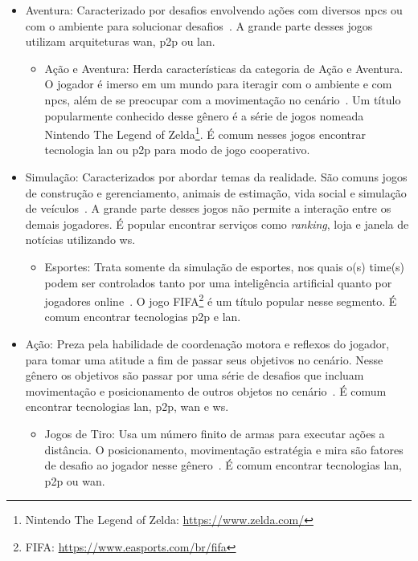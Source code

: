 \begin{itemize}
\begin{itemize}
    \end{itemize}
  \item Aventura: Caracterizado por desafios envolvendo ações com diversos \ac{npcs} ou com o ambiente para solucionar desafios~\cite{adams_1208533}. A grande parte desses jogos utilizam arquiteturas \ac{wan}, \ac{p2p} ou \ac{lan}.
    \begin{itemize}
      \item Ação e Aventura: Herda características da categoria de Ação e Aventura. O jogador é imerso em um mundo para iteragir com o ambiente e com \ac{npcs}, além de se preocupar com a movimentação no cenário~\cite{adams_1208533}. Um título popularmente conhecido desse gênero é a série de jogos nomeada Nintendo The Legend of Zelda\footnote{Nintendo The Legend of Zelda: \url{https://www.zelda.com/}}. É comum nesses jogos encontrar tecnologia \ac{lan} ou \ac{p2p} para modo de jogo cooperativo.
    \end{itemize}
  \item Simulação: Caracterizados por abordar temas da realidade. São comuns jogos de construção e gerenciamento, animais de estimação, vida social e simulação de veículos~\cite{adams_1208533}. A grande parte desses jogos não permite a interação entre os demais jogadores. É popular encontrar serviços como \textit{ranking}, loja e janela de notícias utilizando \ac{ws}.
    \begin{itemize}
      \item Esportes: Trata somente da simulação de esportes, nos quais o(s) time(s) podem ser controlados tanto por uma inteligência artificial quanto por jogadores online~\cite{adams_1208533}. O jogo FIFA\footnote{FIFA: \url{https://www.easports.com/br/fifa}} é um título popular nesse segmento. É comum encontrar tecnologias \ac{p2p} e \ac{lan}.
    \end{itemize}
  \item Ação: Preza pela habilidade de coordenação motora e reflexos do jogador, para tomar uma atitude a fim de passar seus objetivos no cenário. Nesse gênero os objetivos são passar por uma série de desafios que incluam movimentação e posicionamento de outros objetos no cenário~\cite{adams_1208533}. É comum encontrar tecnologias \ac{lan}, \ac{p2p}, \ac{wan} e \ac{ws}.
    \begin{itemize}
      \item Jogos de Tiro: Usa um número finito de armas para executar ações a distância. O posicionamento, movimentação estratégia e mira são fatores de desafio ao jogador nesse gênero~\cite{adams_1208533}. É comum encontrar tecnologias \ac{lan}, \ac{p2p} ou \ac{wan}.

\end{itemize}
\end{itemize}
